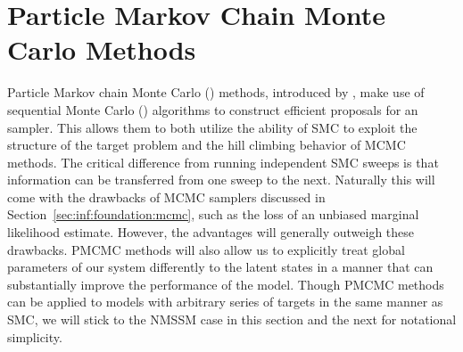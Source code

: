 
\section{Particle Markov Chain Monte Carlo Methods}
\label{sec:part:pmcmc}

Particle Markov chain Monte Carlo (\pmcmc) methods, introduced by \citet{andrieu2010particle}, make use of 
sequential Monte Carlo (\smc) algorithms \citep{gordon1993novel,doucet2001sequential} to construct 
efficient proposals for an \mcmc sampler. This allows them to both utilize the ability of SMC to
exploit the structure of the target problem and the hill climbing behavior of MCMC methods.
The critical difference from running independent SMC sweeps is that information can be transferred
from one sweep to the next. 
Naturally this will come with the drawbacks of MCMC samplers
discussed in Section~\ref{sec:inf:foundation:mcmc}, such as the loss of an unbiased marginal likelihood estimate.
However, the advantages will generally outweigh these drawbacks.  PMCMC methods will also allow us to explicitly
treat global parameters of our system differently to the latent states in a manner that can substantially improve
the performance of the model.
Though PMCMC methods can be applied to models with arbitrary series of targets in the same manner as SMC, we will stick
to the NMSSM case in this section and the next for notational simplicity.

